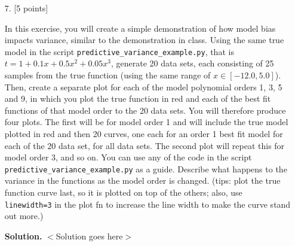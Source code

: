 \documentclass[10pt]{article}
\begin{document}
\begin{itemize}

%
%


\item[7.] [5 points]

In this exercise, you will create a simple demonstration of how model bias impacts variance, similar to the demonstration in class.  Using the same true model in the script {\tt predictive\_variance\_example.py}, that is $t = 1 + 0.1x + 0.5x^2 + 0.05x^3$, generate 20 data sets, each consisting of 25 samples from the true function (using the same range of $x \in [-12.0,5.0]$).  Then, create a separate plot for each of the model polynomial orders 1, 3, 5 and 9, in which you plot the true function in red and each of the best fit functions of that model order to the 20 data sets.  You will therefore produce four plots.  The first will be for model order 1 and will include the true model plotted in red and then 20 curves, one each for an order 1 best fit model for each of the 20 data set, for all data sets.  The second plot will repeat this for model order 3, and so on.  You can use any of the code in the script {\tt predictive\_variance\_example.py} as a guide.  Describe what happens to the variance in the functions as the model order is changed.  (tips: plot the true function curve last, so it is plotted on top of the others; also, use {\tt linewidth=3} in the plot fn to increase the line width to make the curve stand out more.)

{\bf Solution.} $<$Solution goes here$>$

%
%




\end{itemize}
\end{document}

